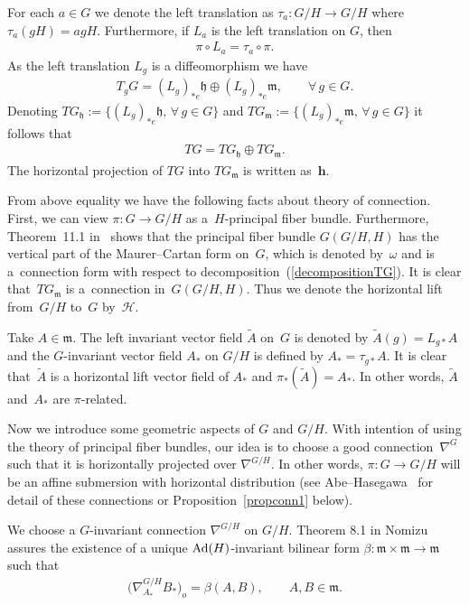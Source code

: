 \documentclass[pdftex]{sigma}
\numberwithin{equation}{section}
\newcommand{\m}{\mathfrak{m}}
\begin{document}
For each $a \in G$ we denote the left translation as $\tau_{a}\colon G/H \rightarrow G/H$ where $\tau_{a}(gH) = agH$.  Furthermore, if $L_{a}$ is the left translation on $G$, then
\begin{gather*}
  \pi \circ L_{a} = \tau_{a} \circ \pi.
\end{gather*}
As the left translation $L_{g}$ is a dif\/feomorphism we have
\begin{gather*}
  T_{g}G = (L_{g})_{*e}\mathfrak{h} \oplus (L_{g})_{*e}\mathfrak{m}, \qquad \forall\,  g \in G.
\end{gather*}
Denoting $TG_{\mathfrak{h}}:= \{ (L_{g})_{*e}\mathfrak{h}, \, \forall\, g \in G \}$ and $TG_{\mathfrak{m}}:= \{ (L_{g})_{*e}\mathfrak{m},\,\forall\, g \in G \}$ it follows that
\begin{gather}\label{decompositionTG}
  TG = TG_{\mathfrak{h}} \oplus TG_{\mathfrak{m}}.
\end{gather}
The horizontal projection of $TG$ into $TG_{\mathfrak{m}}$ is written as~$\mathbf{h}$.

From above equality we have the following facts about theory of
connection. First, we can view $\pi\colon G \rightarrow G/H$ as a~$H$-principal f\/iber bundle. Furthermore, Theorem~11.1 in~\cite{KobayashiS/NomizuK} shows that the principal f\/iber bundle
$G(G/H,H)$ has the vertical part of the Maurer--Cartan form on~$G$,
which is denoted by~$\omega$ and is a~connection form with respect
to decomposition~(\ref{decompositionTG}). It is clear that~$TG_{\m}$
is a~connection in~$G(G/H,H)$. Thus we denote the horizontal lift
from~$G/H$ to~$G$ by~$\mathcal{H}$.

Take $A \in \m$. The left invariant vector f\/ield $\tilde{A}$ on~$G$ is denoted by $\tilde{A}(g) = L_{g*}A$ and the $G$-invariant vector f\/ield $A_{*}$ on $G/H$ is def\/ined by $A_{*} =\tau_{g*}A$. It is clear that~$\tilde{A}$ is a horizontal lift vector f\/ield of $A_{*}$ and $\pi_*(\tilde{A})= A_*$. In other words, $\tilde{A}$ and~$A_{*}$ are $\pi$-related.

Now we introduce  some geometric aspects of $G$ and $G/H$. With
intention of using the theory of principal f\/iber bundles, our idea
is to choose a good connection~$\nabla^{G}$ such that it is
horizontally  projected over $\nabla^{G/H}$. In other words, $\pi\colon G
\rightarrow G/H$ will be an af\/f\/ine submersion with horizontal
distribution (see Abe--Hasegawa~\cite{AbeN/HasewagaK} for detail of
these connections or Proposition~\ref{propconn1} below).

We choose a $G$-invariant connection $\nabla^{G/H}$ on $G/H$.
Theorem 8.1 in Nomizu \cite{Nomizu} assures the existence of a
unique ${\rm Ad}(H)$-invariant bilinear form $\beta\colon  \m \times \m
\rightarrow \m$ such that
\begin{gather*}
  \big(\nabla^{G/H}_{A_*}B_*\big)_{o} = \beta(A,B), \qquad A, B \in \m.
\end{gather*}
\end{document}
